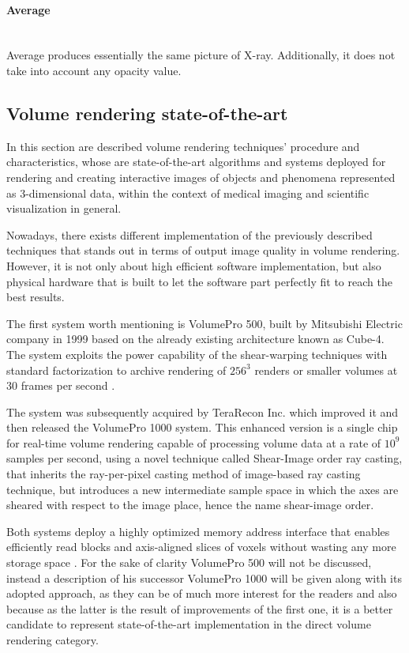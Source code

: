 \documentclass[12pt,a4paper]{extarticle}
\newcommand{\linespace}{\vspace{0pt}}
\newcommand{\myparagraph}[1]{\paragraph{#1}\mbox{}\\}
\begin{document}
\myparagraph{Average} Average produces essentially the same picture of X-ray. Additionally, it does not take into account any opacity value.

\subsection{Volume rendering state-of-the-art} 

In this section are described volume rendering techniques' procedure and characteristics, whose are state-of-the-art algorithms and systems deployed for rendering and creating interactive images of objects and phenomena represented as 3-dimensional data, within the context of medical imaging and scientific visualization in general. 

Nowadays, there exists different implementation of the previously described techniques that stands out in terms of output image quality in volume rendering. However, it is not only about high efficient software implementation, but also physical hardware that is built to let the software part perfectly fit to reach the best results.
\linespace

The first system worth mentioning is VolumePro 500, built by Mitsubishi Electric company in 1999 based on the already existing architecture known as Cube-4. The system exploits the power capability of the shear-warping techniques with standard factorization to archive rendering of $256^3$ renders or smaller volumes at 30 frames per second  \cite{Pfister:1999:VRR:311535.311563}. 


The system was subsequently acquired by TeraRecon Inc. which improved it and then released the VolumePro 1000 system. This enhanced version is a single chip for real-time volume rendering capable of processing volume data at a rate of $10^9$ samples per second, using a novel technique called Shear-Image order ray casting, that inherits the ray-per-pixel casting method of image-based ray casting technique, but introduces a new intermediate sample space in which the axes are sheared with respect to the image place, hence the name shear-image order. 
\linespace

Both systems deploy a highly optimized memory address interface that enables efficiently read blocks and axis-aligned slices of voxels without wasting any more storage space \cite{Wu:2003:SOR:641480.641510}.
For the sake of clarity VolumePro 500 will not be discussed, instead a description of his successor VolumePro 1000 will be given along with its adopted approach, as they can be of much more interest for the readers and also because as the latter is the result of improvements of the first one, it is a better candidate to represent state-of-the-art implementation in the direct volume rendering category. 
\end{document}
